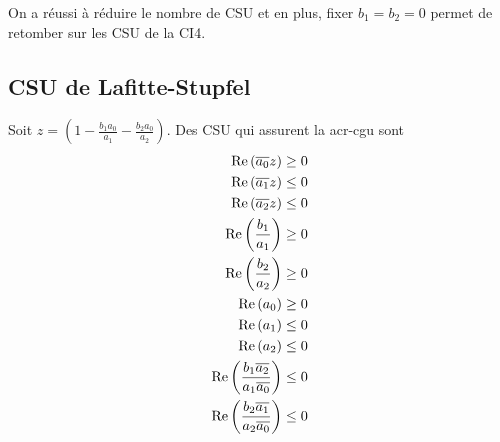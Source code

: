   On a réussi à réduire le nombre de CSU et en plus, fixer \(b_1=b_2=0\) permet de retomber sur les CSU de la CI4.

\subsection{CSU de Lafitte-Stupfel}

  \begin{prop}
    Soit \(z = \left(1 - \frac{b_1a_0}{a_1} - \frac{b_2a_0}{a_2}\right) \). Des CSU qui assurent la \gls{acr-cgu} sont
    \begin{align}
      \operatorname{Re}\left({\overline{a_0}}z\right) \ge 0
      \\
      \operatorname{Re}\left({\overline{a_1}}z\right) \le 0
      \\
      \operatorname{Re}\left({\overline{a_2}}z\right) \le 0
      \\
      \operatorname{Re}\left(\dfrac{b_1}{a_1}\right) \ge 0
      \\
      \operatorname{Re}\left(\dfrac{b_2}{a_2}\right) \ge 0
      \\
      \operatorname{Re}\left(a_0\right) \ge 0
      \\
      \operatorname{Re}\left(a_1\right) \le 0
      \\
      \operatorname{Re}\left(a_2\right) \le 0
      \\
      \operatorname{Re}\left(\dfrac{b_1{\overline{a_2}}}{a_1{\overline{a_0}}}\right) \le 0
      \\
      \operatorname{Re}\left(\dfrac{b_2{\overline{a_1}}}{a_2{\overline{a_0}}}\right) \le 0
    \end{align}
  \end{prop}
